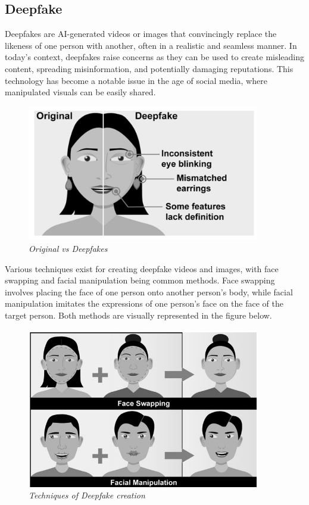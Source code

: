 \subsection{Deepfake}
Deepfakes are AI-generated videos or images that convincingly replace the likeness of one person with another, often in a realistic and seamless manner. In today's context, deepfakes raise concerns as they can be used to create misleading content, spreading misinformation, and potentially damaging reputations. This technology has become a notable issue in the age of social media, where manipulated visuals can be easily shared.\\

\begin{figure}[htbp]
    \centering
    \includegraphics[width=4in]{img/deefakeface.png}
    \caption{\textit{Original vs Deepfakes }}
\end{figure}

Various techniques exist for creating deepfake videos and images, with face swapping and facial manipulation being common methods. Face swapping involves placing the face of one person onto another person's body, while facial manipulation imitates the expressions of one person's face on the face of the target person. Both methods are visually represented in the figure below.\\

\begin{figure}[htbp]
    \centering
    \includegraphics[width=4in]{img/face manipulation.png}
    \caption{\textit{Techniques of Deepfake creation}}
\end{figure}

\newpage


